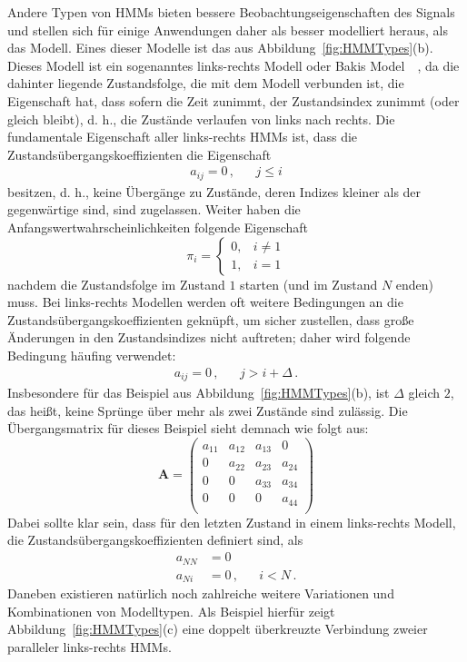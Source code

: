 Andere Typen von \acrshort{HMM}s bieten bessere Beobachtungseigenschaften des Signals und stellen sich f\"ur einige Anwendungen daher als besser modelliert heraus, als das  Modell. Eines dieser Modelle ist das aus  Abbildung~\ref{fig:HMMTypes}(b). Dieses Modell ist ein sogenanntes links-rechts Modell oder Bakis Model~\cite{bib:jelinek}~\cite{bib:bakis}, da die dahinter liegende Zustandsfolge, die mit dem Modell verbunden ist, die Eigenschaft hat, dass sofern die Zeit zunimmt, der Zustandsindex zunimmt (oder gleich bleibt), d. h., die Zust\"ande verlaufen von links nach rechts. Die fundamentale Eigenschaft aller links-rechts HMMs ist, dass die Zustands\"ubergangskoeffizienten die Eigenschaft
\begin{align}
a_{ij} = 0 \, , & & j \leq i
\end{align}
besitzen, d. h., keine \"Uberg\"ange zu Zust\"ande, deren Indizes kleiner als der gegenw\"artige sind, sind zugelassen. Weiter haben die Anfangswertwahrscheinlichkeiten folgende Eigenschaft
\[
\pi_i = 
\begin{cases}
	0, & i \ne 1 \\
	1, & i = 1
\end{cases}
\]
nachdem die Zustandsfolge im Zustand $1$ starten (und im Zustand $N$ enden) muss. Bei links-rechts Modellen werden oft weitere Bedingungen an die Zustands\"ubergangskoeffizienten gekn\"upft, um sicher zustellen, dass gro\ss e \"Anderungen in den Zustandsindizes nicht auftreten; daher wird folgende Bedingung h\"aufing verwendet:
\begin{align}
a_{ij} = 0 \, , & & j > i + \varDelta \, .
\end{align}
Insbesondere f\"ur das Beispiel aus Abbildung~\ref{fig:HMMTypes}(b), ist $\varDelta$ gleich $2$, das hei\ss t, keine Spr\"unge \"uber mehr als zwei Zust\"ande sind zul\"assig. Die \"Ubergangsmatrix f\"ur dieses Beispiel sieht demnach wie folgt aus:
\begin{equation}
\mathbf{A} = 
\begin{pmatrix}
a_{11} & a_{12} & a_{13} &0 \\
0 & a_{22} & a_{23} & a_{24} \\
0 & 0 & a_{33} & a_{34} \\
0 & 0 & 0 & a_{44} \\
\end{pmatrix}
\end{equation}
Dabei sollte klar sein, dass f\"ur den letzten Zustand in einem links-rechts Modell, die Zustands\"ubergangskoeffizienten definiert sind, als
\begin{subequations}
\begin{align}
\label{E:TransitionProperties}
a_{NN} &= 0  \\
a_{Ni} &= 0 \, , & & i < N \, . 
\end{align}
\end{subequations}
Daneben existieren nat\"urlich noch zahlreiche weitere Variationen und Kombinationen von Modelltypen. Als Beispiel hierf\"ur zeigt Abbildung~\ref{fig:HMMTypes}(c) eine doppelt \"uberkreuzte Verbindung zweier paralleler links-rechts HMMs.